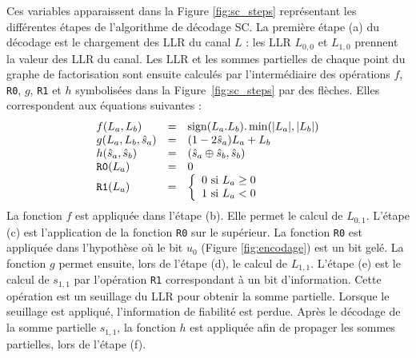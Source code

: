 Ces variables apparaissent dans la Figure \ref{fig:sc_steps} représentant les différentes étapes de l'algorithme de décodage SC.
La première étape (a) du décodage est le chargement des LLR du canal $L$ : les LLR $L_{0,0}$ et $L_{1,0}$ prennent la valeur des LLR du canal. Les LLR et les sommes partielles de chaque point du graphe de factorisation sont ensuite calculés par l'intermédiaire des opérations $f$, \texttt{R0}, $g$, \texttt{R1} et $h$ symbolisées dans la Figure~\ref{fig:sc_steps} par des flèches. Elles correspondent aux équations suivantes :
\begin{eqnarray}
  \begin{array}{l c l}
    f(L_a,L_b) &=& \text{sign}(L_a.L_b).\min(|L_a|,|L_b|)\\
    g(L_a,L_b,\hat{s}_a)&=&(1-2\hat{s}_a)L_a+L_b\\
    h(\hat{s}_a,\hat{s}_b)&=& (\hat{s}_{a} \oplus \hat{s}_{b}, \hat{s}_{b})\\
    \texttt{R0}(L_a) &=& 0 \\
    \texttt{R1}(L_a) &=&  \left\{\begin{array}{l c l} 0 \text{ si } L_a \geq 0 \\ 1 \text{ si } L_a < 0 \end{array}\right.
  \end{array}
  \label{eq:sc}
\end{eqnarray}
La fonction $f$ est appliquée dans l'étape (b). Elle permet le calcul de $L_{0,1}$.
L'étape (c) est l'application de la fonction \texttt{R0} sur le \noeud supérieur. 
La fonction \texttt{R0} est appliquée dans l'hypothèse où le bit $u_0$ (Figure \ref{fig:encodage}) est un bit gelé.
La fonction $g$ permet ensuite, lors de l'étape (d), le calcul de $L_{1,1}$.
L'étape (e) est le calcul de $s_{1,1}$ par l'opération \texttt{R1} correspondant à un bit d'information. 
Cette opération est un seuillage du LLR pour obtenir la somme partielle.
Lorsque le seuillage est appliqué, l'information de fiabilité est perdue.
Après le décodage de la somme partielle $s_{1,1}$, la fonction $h$ est appliquée afin de propager les sommes partielles, lors de l'étape (f).


